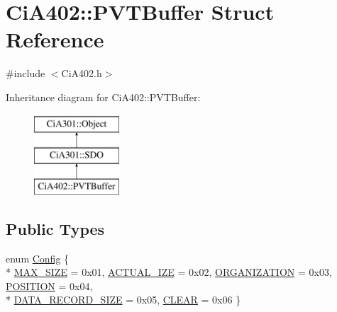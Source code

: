 \hypertarget{struct_ci_a402_1_1_p_v_t_buffer}{\section{Ci\-A402\-:\-:P\-V\-T\-Buffer Struct Reference}
\label{struct_ci_a402_1_1_p_v_t_buffer}
}


{\ttfamily \#include $<$Ci\-A402.\-h$>$}

Inheritance diagram for Ci\-A402\-:\-:P\-V\-T\-Buffer\-:\begin{figure}[H]
\begin{center}
\leavevmode
\includegraphics[height=3.000000cm]{dc/d91/struct_ci_a402_1_1_p_v_t_buffer}
\end{center}
\end{figure}
\subsection*{Public Types}
\begin{DoxyCompactItemize}
\item 
enum \hyperlink{struct_ci_a402_1_1_p_v_t_buffer_ab39588e1f028f9838c2a85fce3f74926}{Config} \{ \\*
\hyperlink{struct_ci_a402_1_1_p_v_t_buffer_ab39588e1f028f9838c2a85fce3f74926ae7555e4da3733a103dcf97c8d0a78a68}{M\-A\-X\-\_\-\-S\-I\-Z\-E} = 0x01, 
\hyperlink{struct_ci_a402_1_1_p_v_t_buffer_ab39588e1f028f9838c2a85fce3f74926a477d59b02656bf3ac4a141ab97ca5491}{A\-C\-T\-U\-A\-L\-\_\-\-I\-Z\-E} = 0x02, 
\hyperlink{struct_ci_a402_1_1_p_v_t_buffer_ab39588e1f028f9838c2a85fce3f74926a704e9ee6d32403fb41ebeac87040169b}{O\-R\-G\-A\-N\-I\-Z\-A\-T\-I\-O\-N} = 0x03, 
\hyperlink{struct_ci_a402_1_1_p_v_t_buffer_ab39588e1f028f9838c2a85fce3f74926a7384b0c0c8a358e4ebbf3008e494cf07}{P\-O\-S\-I\-T\-I\-O\-N} = 0x04, 
\\*
\hyperlink{struct_ci_a402_1_1_p_v_t_buffer_ab39588e1f028f9838c2a85fce3f74926aea0a09cf7b145586d56a5577760bd5c4}{D\-A\-T\-A\-\_\-\-R\-E\-C\-O\-R\-D\-\_\-\-S\-I\-Z\-E} = 0x05, 
\hyperlink{struct_ci_a402_1_1_p_v_t_buffer_ab39588e1f028f9838c2a85fce3f74926a52825a98de8250e1b2fe3fbb8f9d29a4}{C\-L\-E\-A\-R} = 0x06
 \}
\end{DoxyCompactItemize}
